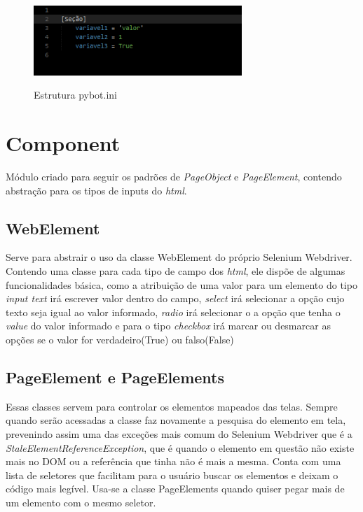         \begin{figure}[H]
            \vspace*{0,3cm}
            \centering
            \caption{Estrutura pybot.ini}
            \includegraphics[width=0.7\textwidth]{./04-figuras/ini}
            \label{fig:pybot.ini}
        \end{figure}

    \section{Component}
    \label{Comp}
        Módulo criado para seguir os padrões de \emph{PageObject} e \emph{PageElement}, contendo abstração para os tipos de inputs do \emph{html}.

        \subsection{WebElement}
            Serve para abstrair o uso da classe WebElement do próprio Selenium Webdriver. Contendo uma classe para cada tipo de campo dos \emph{html},
            ele dispõe de algumas funcionalidades básica, como a atribuição de uma valor para um elemento do tipo \emph{input text} irá escrever
            valor dentro do campo, \emph{select} irá selecionar a opção cujo texto seja igual ao valor informado, \emph{radio} irá selecionar o
            a opção que tenha o \emph{value} do valor informado e para o tipo \emph{checkbox} irá marcar ou desmarcar as opções se o valor for
            verdadeiro(True) ou falso(False)

        \subsection{PageElement e PageElements}
        \label{PageElement}
            Essas classes servem para controlar os elementos mapeados das telas. Sempre quando serão acessadas a classe faz novamente a pesquisa
            do elemento em tela, prevenindo assim uma das exceções mais comum do Selenium Webdriver que é a \emph{StaleElementReferenceException},
            que é quando o elemento em questão não existe mais no DOM ou a referência que tinha não é mais a mesma. Conta com uma lista de seletores
            que facilitam para o usuário buscar os elementos e deixam o código mais legível. Usa-se a classe PageElements quando quiser pegar mais
            de um elemento com o mesmo seletor.

